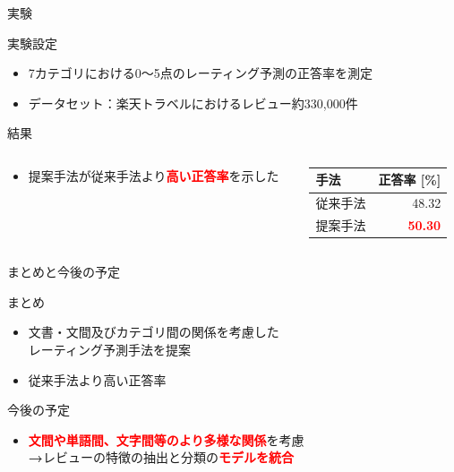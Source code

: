\documentclass[aspectratio=43,unicode,10pt]{beamer}
\newcommand{\fire}[1]{\textcolor{red}{\textbf{#1}}}
\newcommand{\arrow}{\textcolor{ttiblue}{\textbf{→}}\hspace{1ex}}
\begin{document}
\begin{frame}{実験}{}
  \begin{block}{実験設定}
    \begin{itemize}
      \item 7カテゴリにおける0〜5点のレーティング予測の正答率を測定
      \item データセット：楽天トラベルにおけるレビュー約330,000件
    \end{itemize}
  \end{block}
  \begin{block}{結果}
    \begin{columns}[onlytextwidth,t]
      \begin{column}{0.6\linewidth}
        \begin{itemize}
          \item 提案手法が従来手法より\fire{高い正答率}を示した
        \end{itemize}
      \end{column}
      \begin{column}{0.4\linewidth}
        \begin{table}
          \centering
          \begin{tabular}{l | r}
            手法 & 正答率 {[}\%{]} \\
            \hline
            従来手法 & 48.32 \\
            提案手法 & \fire{50.30} \\
          \end{tabular}
        \end{table}
      \end{column}
    \end{columns}
  \end{block}
\end{frame}

\begin{frame}{まとめと今後の予定}{}
  \begin{block}{まとめ}
    \begin{itemize}
      \item 文書・文間及びカテゴリ間の関係を考慮した \\
            レーティング予測手法を提案
      \item 従来手法より高い正答率
    \end{itemize}
  \end{block}
  \begin{block}{今後の予定}
    \begin{itemize}
      \item \fire{文間や単語間、文字間等のより多様な関係}を考慮 \\
            \arrow レビューの特徴の抽出と分類の\fire{モデルを統合}
    \end{itemize}
  \end{block}
\end{frame}
\end{document}
